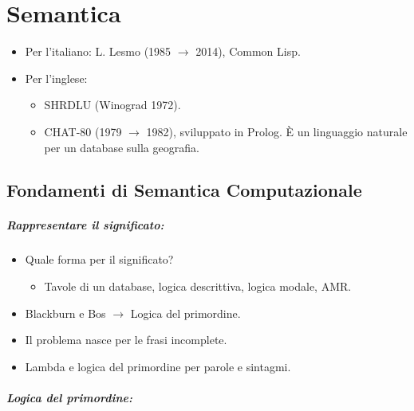 \chapter{Semantica}


\begin{itemize}
  \item Per l'italiano: L. Lesmo (1985 $\rightarrow$ 2014), Common Lisp.
  \item Per l'inglese: 
    \begin{itemize}
      \item SHRDLU (Winograd 1972). 
      \item CHAT-80 (1979 $\rightarrow$ 1982), sviluppato in Prolog. È un linguaggio naturale per un database sulla geografia.
    \end{itemize}
\end{itemize}

\section{Fondamenti di Semantica Computazionale}


\paragraph{Rappresentare il significato:}

\begin{itemize}
  \item Quale forma per il significato?
    \begin{itemize}
      \item Tavole di un database, logica descrittiva, logica modale, AMR. 
    \end{itemize}
  \item Blackburn e Bos $\rightarrow$ Logica del primordine. 
  \item Il problema nasce per le frasi incomplete. 
  \item Lambda e logica del primordine per parole e sintagmi.
\end{itemize}

\paragraph{Logica del primordine:}

